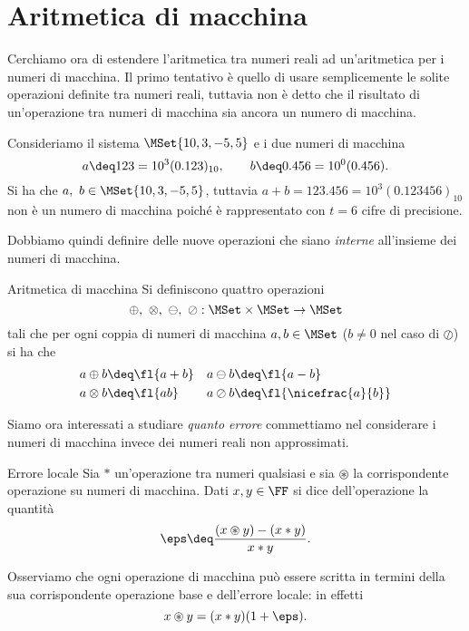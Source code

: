 \section{Aritmetica di macchina}

Cerchiamo ora di estendere l'aritmetica tra numeri reali ad un'aritmetica per i numeri di macchina. Il primo tentativo è quello di usare semplicemente le solite operazioni definite tra numeri reali, tuttavia non è detto che il risultato di un'operazione tra numeri di macchina sia ancora un numero di macchina.

\begin{example}
    Consideriamo il sistema $\MSet{10, 3, -5, 5}$ e i due numeri di macchina \[
        a \deq 123 = 10^3 (0.123)_{10}, \qquad b \deq 0.456 = 10^0 (0.456).
    \] Si ha che $a,\ b \in \MSet{10, 3, -5, 5}$, tuttavia $a + b = 123.456 = 10^3 (0.123456)_{10}$ non è un numero di macchina poiché è rappresentato con $t = 6$ cifre di precisione.
\end{example}

Dobbiamo quindi definire delle nuove operazioni che siano \emph{interne} all'insieme dei numeri di macchina.

\begin{definition}
    {Aritmetica di macchina}{}
    Si definiscono quattro operazioni \[
        \oplus,\ \otimes,\ \ominus,\ \oslash : \MSet \times \MSet \to \MSet
    \] tali che per ogni coppia di numeri di macchina $a, b \in \MSet$ ($b \neq 0$ nel caso di $\oslash$) si ha che \begin{align*}
        &a \oplus b \deq \fl{a + b} &&a \ominus b \deq \fl{a - b}\\
        &a \otimes b \deq \fl{ab}   &&a \oslash b \deq \fl{\nicefrac{a}{b}}
    \end{align*}
\end{definition}

Siamo ora interessati a studiare \emph{quanto errore} commettiamo nel considerare i numeri di macchina invece dei numeri reali non approssimati.

\begin{definition}
    {Errore locale}{}
    Sia $\ast$ un'operazione tra numeri qualsiasi e sia $\circledast$ la corrispondente operazione su numeri di macchina. Dati $x, y \in \FF$ si dice  dell'operazione la quantità \[
        \eps \deq \frac{(x \circledast y) - (x \ast y)}{x \ast y}.
    \]
\end{definition}

Osserviamo che ogni operazione di macchina può essere scritta in termini della sua corrispondente operazione base e dell'errore locale: in effetti \[
    x \circledast y = (x \ast y)(1 + \eps).
\]

